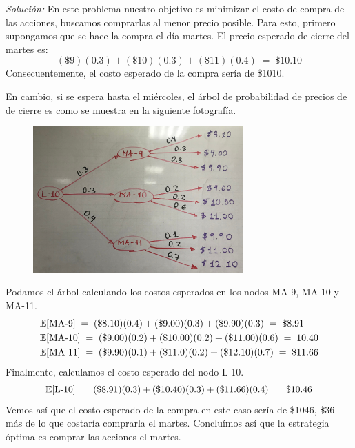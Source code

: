 \documentclass[ a4paper, twoside, 11pt]{article}
\begin{document}
\emph{Soluci\'on:} En este problema nuestro objetivo es minimizar el costo de compra de las acciones, \ie buscamos comprarlas al menor precio posible. Para esto, primero supongamos que se hace la compra el d\'ia martes. El precio esperado de cierre del martes es: 
\[
(\$9)(0.3) + (\$10)(0.3) + (\$11)(0.4) \; = \; \$10.10
\]
Consecuentemente, el costo esperado de la compra ser\'ia de \$1010. 

En cambio, si se espera hasta el mi\'ercoles, el \'arbol de probabilidad de precios de de cierre es como se muestra en la siguiente fotograf\'ia. 

\begin{figure}[H]
\centering
\includegraphics[width=0.72\textwidth]{problema-2.jpg}
\end{figure}

Podamos el \'arbol calculando los costos esperados en los nodos MA-9, MA-10 y MA-11. 
\begin{align*}
& \mathbb{E}[\text{MA-9}] \; = \; 
(\$8.10)(0.4) + (\$9.00)(0.3) + (\$9.90)(0.3)
\; = \; \$8.91 \\
& \mathbb{E}[\text{MA-10}] \; = \; 
(\$9.00)(0.2) + (\$10.00)(0.2) + (\$11.00)(0.6)
\; = \; 10.40 \\
& \mathbb{E}[\text{MA-11}] \; = \; 
(\$9.90)(0.1) + (\$11.0)(0.2) + (\$12.10)(0.7) \; = \; \$11.66
\end{align*}
Finalmente, calculamos el costo esperado del nodo L-10. 
\[
\mathbb{E}[\text{L-10}] \; = \;
(\$8.91)(0.3) + (\$10.40)(0.3) + (\$11.66)(0.4) \; = \; \$10.46
\]
Vemos as\'i que el costo esperado de la compra en este caso ser\'ia de \$1046, \ie \$36 m\'as de lo que costar\'ia comprarla el martes. Conclu\'imos as\'i que la estrategia \'optima es comprar las acciones el martes. 
\end{document}
